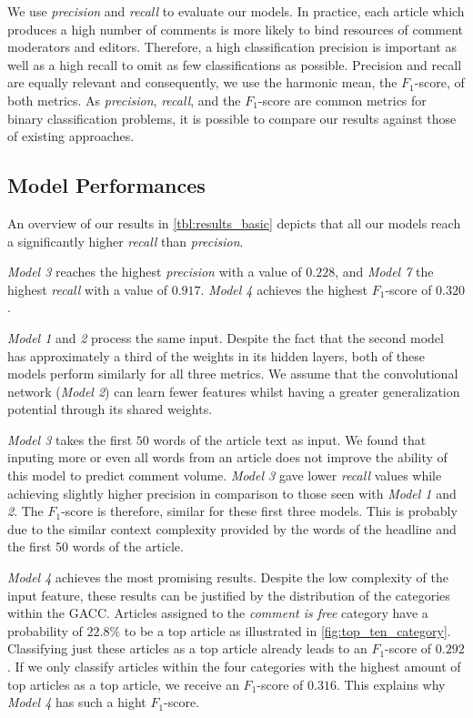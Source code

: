 We use \textit{precision} and \textit{recall} to evaluate our models. 
In practice, each article which produces a high number of comments is more likely to bind resources of comment moderators and editors.
Therefore, a high classification precision is important as well as a high recall to omit as few classifications as possible.
Precision and recall are equally relevant and consequently, we use the harmonic mean, the $F_1$-score, of both metrics. As \textit{precision}, \textit{recall}, and the $F_1$-score are common metrics for binary classification problems, it is possible to compare our results against those of existing approaches.

\subsection{Model Performances}
An overview of our results in \autoref{tbl:results_basic} depicts that all our models reach a significantly higher \textit{recall} than \textit{precision}.

\textit{Model 3} reaches the highest \textit{precision} with a value of $0.228$, and \textit{Model 7} the highest \textit{recall} with a value of $0.917$. \textit{Model 4} achieves the highest $F_1$-score of $0.320$. 



\textit{Model 1} and \textit{2} process the same input. Despite the fact that the second model has approximately a third of the weights in its hidden layers, both of these models perform similarly for all three metrics.
We assume that the convolutional network (\textit{Model 2}) can learn fewer features whilst having a greater generalization potential through its shared weights.

\textit{Model 3} takes the first $50$ words of the article text as input. 
We found that inputing more or even all words from an article does not improve the ability of this model to predict comment volume.
\textit{Model 3} gave lower \textit{recall} values while achieving slightly higher precision in comparison to those seen with \textit{Model 1} and \textit{2}. 
The $F_1$-score is therefore, similar for these first three models.
This is probably due to the similar context complexity provided by the words of the headline and the first 50 words of the article.

\textit{Model 4} achieves the most promising results. 
Despite the low complexity of the input feature, these results can be justified by the distribution of the categories within the GACC. 
Articles assigned to the \textit{comment is free} category have a probability of $22.8\%$ to be a top article as illustrated in \autoref{fig:top_ten_category}. 
Classifying just these articles as a top article already leads to an $F_1$-score of $0.292$.
If we only classify articles within the four categories with the highest amount of top articles as a top article, we receive an $F_1$-score of $0.316$. 
This explains why \textit{Model 4} has such a hight $F_1$-score.

